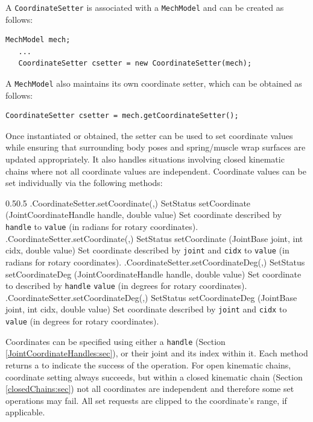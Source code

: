 A {\tt CoordinateSetter} is associated with a {\tt MechModel} and can be
created as follows:
%
\begin{lstlisting}[]
   MechModel mech;
   ...
   CoordinateSetter csetter = new CoordinateSetter(mech);
\end{lstlisting}
%
A {\tt MechModel} also maintains its own coordinate setter, which can be
obtained as follows:
%
\begin{lstlisting}[]
   CoordinateSetter csetter = mech.getCoordinateSetter();
\end{lstlisting}
%
Once instantiated or obtained, the setter can be used to set coordinate values
while ensuring that surrounding body poses and spring/muscle wrap surfaces are
updated appropriately. It also handles situations involving closed kinematic
chains where not all coordinate values are independent.  Coordinate values can
be set individually via the following methods:
%
\begin{methodtable}{0.5}{0.5}
\midline
%
\methodentry
{\mech.CoordinateSetter.setCoordinate(,)}%
{SetStatus setCoordinate (\brh JointCoordinateHandle handle, double value)}%
{Set coordinate described by {\tt handle} to {\tt value} 
(in radians for rotary coordinates).}%
%
\methodentry
{\mech.CoordinateSetter.setCoordinate(,)}%
{SetStatus setCoordinate (\brh JointBase joint, int cidx, double value)}%
{Set coordinate described by {\tt joint} and {\tt cidx} 
to {\tt value} (in radians for rotary coordinates).}%
%
\methodentry
{\mech.CoordinateSetter.setCoordinateDeg(,)}%
{SetStatus setCoordinateDeg (\brh JointCoordinateHandle handle, double value)}%
{Set coordinate to described by {\tt handle} {\tt value} 
(in degrees for rotary coordinates).}%
%
\methodentry
{\mech.CoordinateSetter.setCoordinateDeg(,)}%
{SetStatus setCoordinateDeg (\brh JointBase joint, int cidx, double value)}%
{Set coordinate described by {\tt joint} and {\tt cidx} to {\tt value} 
(in degrees for rotary coordinates).}%
%
\midline
\end{methodtable}
%
Coordinates can be specified using either
a  {\tt handle}
(Section \ref{JointCoordinateHandles:sec}), or their joint and its index within
it.  Each method returns a  to
indicate the success of the operation. For open kinematic chains, coordinate
setting always succeeds, but within a closed kinematic chain
(Section \ref{closedChains:sec}) not all coordinates are independent and
therefore some set operations may fail.  All set requests are clipped to the
coordinate's range, if applicable.

